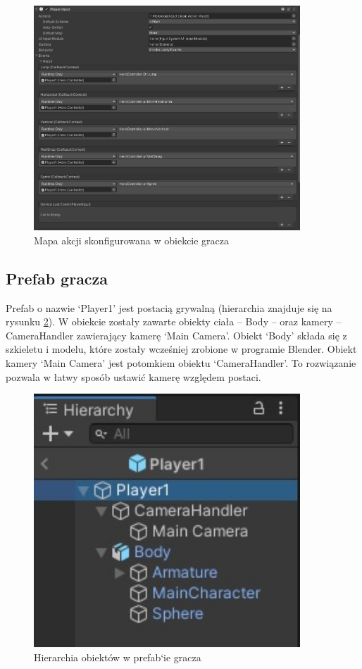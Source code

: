 \documentclass[12pt,twoside]{article}
\begin{document}
\begin{figure}[!ht]
    \centering
	\includegraphics[width=10cm]{RealizacjaProjektu/UnityPictires/InputActionInPlayer.jpg}
	\caption{Mapa akcji skonfigurowana w obiekcie gracza}
    \label{Unity:InputOnPlayer}
\end{figure}

\clearpage
\subsection{Prefab gracza}

Prefab o nazwie `Player1' jest postacią grywalną (hierarchia znajduje się na
rysunku \ref{Hero:OBJhierarchy}). W obiekcie zostały zawarte obiekty ciała –
Body -- oraz kamery -- CameraHandler zawierający kamerę `Main Camera'. Obiekt
`Body' składa się z szkieletu i modelu, które zostały wcześniej zrobione w
programie Blender. Obiekt kamery `Main Camera' jest potomkiem obiektu
`CameraHandler'. To rozwiązanie pozwala w łatwy sposób ustawić kamerę względem
postaci.

\begin{figure}[!ht]
    \centering
	\includegraphics[width=10cm]{RealizacjaProjektu/UnityPictires/Player1_hierarchy.jpg}
	\caption{Hierarchia obiektów w prefab`ie gracza}
    \label{Hero:OBJhierarchy}
\end{figure}
\end{document}
